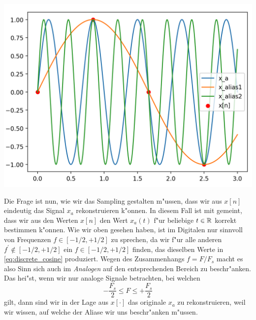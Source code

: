 \begin{listing}
    \noindent
    \begin{minipage}{0.49\textwidth}
        \strut\vspace*{-\baselineskip}\newline
        \inputminted[firstline=4]{python3}{code/aliasing.py}
    \end{minipage}%
    \begin{minipage}{0.49\textwidth}
        \strut\vspace*{-\baselineskip}\newline
        \includegraphics[width=\textwidth]{code/aliasing.png}
    \end{minipage}
    \label{py:aliasing}
\end{listing}

Die Frage ist nun, wie wir das Sampling gestalten m"ussen, dass wir aus $x[n]$ eindeutig das Signal $x_a$ rekonstruieren k"onnen.
In diesem Fall ist mit  gemeint, dass wir aus den Werten $x[n]$ den Wert $x_a(t)$ f"ur beliebige $t \in \mathbb{R}$ korrekt bestimmen k"onnen.
Wie wir oben gesehen haben, ist im Digitalen nur sinnvoll von Frequenzen $f \in [-1/2,+1/2]$ zu sprechen, da wir f"ur alle anderen $f^\prime \notin [-1/2,+1/2]$ ein $f \in [-1/2,+1/2]$ finden, das dieselben Werte in \eqref{eq:discrete_cosine} produziert.
Wegen des Zusammenhangs $f = F/F_s$ macht es also Sinn sich auch im \emph{Analogen} auf den entsprechenden Bereich zu beschr"anken.
Das hei"st, wenn wir nur analoge Signale betrachten, bei welchen
\[
-\frac{F_s}2 \leqslant F \leqslant +\frac{F_s}2
\]
gilt, dann sind wir in der Lage aus $x[\cdot]$ das originale $x_a$ zu rekonstruieren, weil wir wissen, auf welche der Aliase wir uns beschr"anken m"ussen.

